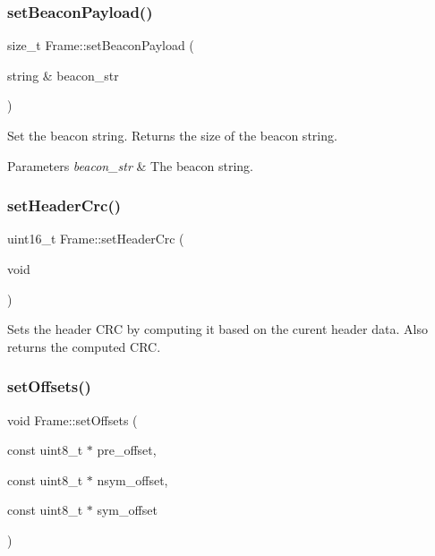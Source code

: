 \subsubsection{\texorpdfstring{set\+Beacon\+Payload()}{setBeaconPayload()}}
{\footnotesize\ttfamily size\+\_\+t Frame\+::set\+Beacon\+Payload (\begin{DoxyParamCaption}\item[{string \&}]{beacon\+\_\+str }\end{DoxyParamCaption})\hspace{0.3cm}{\ttfamily [inline]}}

Set the beacon string. Returns the size of the beacon string. 
\begin{DoxyParams}{Parameters}
{\em beacon\+\_\+str} & The beacon string. \\
\hline
\end{DoxyParams}
\mbox{\label{classFrame_a28beb1dcca5f9f385a10dddab7e4ce21}} 
\subsubsection{\texorpdfstring{set\+Header\+Crc()}{setHeaderCrc()}}
{\footnotesize\ttfamily uint16\+\_\+t Frame\+::set\+Header\+Crc (\begin{DoxyParamCaption}\item[{void}]{ }\end{DoxyParamCaption})\hspace{0.3cm}{\ttfamily [inline]}}

Sets the header C\+RC by computing it based on the curent header data. Also returns the computed C\+RC. \mbox{\label{classFrame_ac25e10413d25b9eea2502c1c02d457e0}} 
\subsubsection{\texorpdfstring{set\+Offsets()}{setOffsets()}}
{\footnotesize\ttfamily void Frame\+::set\+Offsets (\begin{DoxyParamCaption}\item[{const uint8\+\_\+t $\ast$}]{pre\+\_\+offset,  }\item[{const uint8\+\_\+t $\ast$}]{nsym\+\_\+offset,  }\item[{const uint8\+\_\+t $\ast$}]{sym\+\_\+offset }\end{DoxyParamCaption})\hspace{0.3cm}{\ttfamily [inline]}}

